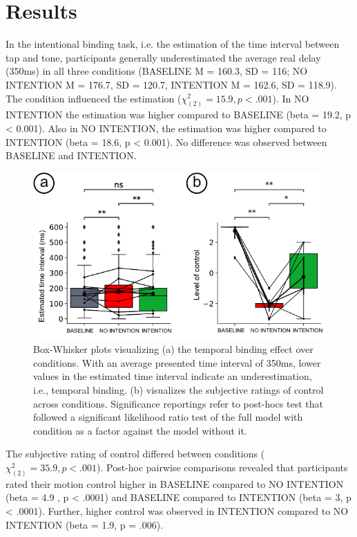 \section{Results}
In the intentional binding task, i.e. the estimation of the time interval between tap and tone, participants generally underestimated the average real delay (350ms) in all three conditions (BASELINE M = 160.3, SD = 116; NO INTENTION M = 176.7, SD = 120.7, INTENTION M = 162.6, SD = 118.9). The condition influenced the estimation (${\chi^{2}_{(2)}} = 15.9, p < .001$). In NO INTENTION the estimation was higher compared to BASELINE (beta = 19.2, p < 0.001). Also in NO INTENTION, the estimation was higher compared to INTENTION (beta = 18.6, p < 0.001). No difference was observed between BASELINE and INTENTION.

\begin{figure}
    \centering
    \includegraphics[width=\columnwidth]{figures/behavioral_results.png}
    \caption{Box-Whisker plots visualizing (a) the temporal binding effect over conditions. With an average presented time interval of 350ms, lower values in the estimated time interval indicate an underestimation, i.e., temporal binding. (b) visualizes the subjective ratings of control across conditions. Significance reportings refer to post-hocs test that followed a significant likelihood ratio test of the full model with condition as a factor against the model without it.}
    \label{fig:results}
\end{figure}

The subjective rating of control differed between conditions (${\chi^{2}_{(2)}} = 35.9, p < .001$). Post-hoc pairwise comparisons revealed that participants rated their motion control higher in BASELINE compared to NO INTENTION (beta = 4.9 , p < .0001) and BASELINE compared to INTENTION (beta = 3, p < .0001). Further, higher control was observed in INTENTION compared to NO INTENTION (beta = 1.9, p = .006).

